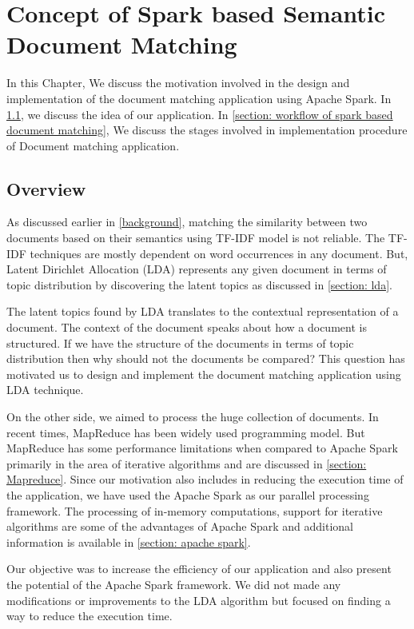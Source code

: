 \chapter{Concept of Spark based Semantic Document Matching}
\label{concept}

In this Chapter, We discuss the motivation involved in the design and implementation of the document matching application using Apache Spark. In \ref{section: Idea}, we discuss the idea of our application. In \ref{section: workflow of spark based document matching}, We discuss the stages involved in implementation procedure of Document matching application.

\section{Overview}
\label{section: Idea}
As discussed earlier in \ref{background}, matching the similarity between two documents based on their semantics using TF-IDF model is not reliable. The TF-IDF techniques are mostly dependent on word occurrences in any document. But, Latent Dirichlet Allocation (LDA) represents any given document in terms of topic distribution by discovering the latent topics as discussed in \ref{section: lda}. 

\par The latent topics found by LDA translates to the contextual representation of a document. The context of the document speaks about how a document is structured. If we have the structure of the documents in terms of topic distribution then why should not the documents be compared?  This question has motivated us to design and implement the document matching application using LDA technique.

\par On the other side, we aimed to process the huge collection of documents. In recent times, MapReduce has been widely used programming model. But MapReduce has some performance limitations when compared to Apache Spark primarily in the area of iterative algorithms and are discussed in \ref{section: Mapreduce}. Since our motivation also includes in reducing the execution time of the application, we have used the Apache Spark as our parallel processing framework. The processing of in-memory computations, support for iterative algorithms are some of the advantages of Apache Spark and additional information is available in \ref{section: apache spark}.

\par Our objective was to increase the efficiency of our application and also present the potential of the Apache Spark framework. We did not made any modifications or improvements to the LDA algorithm but focused on finding a way to reduce the execution time.


